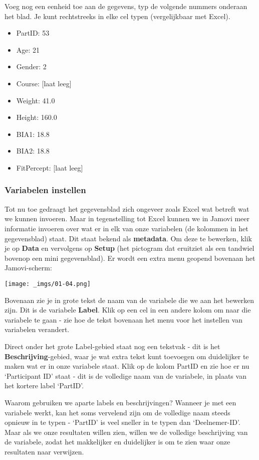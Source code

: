 \documentclass[
  letterpaper,
  DIV=11,
  numbers=noendperiod]{scrartcl}
\providecommand{\tightlist}{%
  \setlength{\itemsep}{0pt}\setlength{\parskip}{0pt}}\usepackage{longtable,booktabs,array}
\begin{document}
Voeg nog een eenheid toe aan de gegevens, typ de volgende nummers
onderaan het blad. Je kunt rechtstreeks in elke cel typen (vergelijkbaar
met Excel).

\begin{itemize}
\tightlist
\item
  PartID: 53
\item
  Age: 21
\item
  Gender: 2
\item
  Course: {[}laat leeg{]}
\item
  Weight: 41.0
\item
  Height: 160.0
\item
  BIA1: 18.8
\item
  BIA2: 18.8
\item
  FitPercept: {[}laat leeg{]}
\end{itemize}

\hypertarget{variabelen-instellen}{%
\subsubsection{Variabelen instellen}\label{variabelen-instellen}}

Tot nu toe gedraagt het gegevensblad zich ongeveer zoals Excel wat
betreft wat we kunnen invoeren. Maar in tegenstelling tot Excel kunnen
we in Jamovi meer informatie invoeren over wat er in elk van onze
variabelen (de kolommen in het gegevensblad) staat. Dit staat bekend als
\textbf{metadata}. Om deze te bewerken, klik je op \textbf{Data} en
vervolgens op \textbf{Setup} (het pictogram dat eruitziet als een
tandwiel bovenop een mini gegevensblad). Er wordt een extra menu geopend
bovenaan het Jamovi-scherm:

\texttt{[image: \_imgs/01-04.png]}

Bovenaan zie je in grote tekst de naam van de variabele die we aan het
bewerken zijn. Dit is de variabele \textbf{Label}. Klik op een cel in
een andere kolom om naar die variabele te gaan - zie hoe de tekst
bovenaan het menu voor het instellen van variabelen verandert.

Direct onder het grote Label-gebied staat nog een tekstvak - dit is het
\textbf{Beschrijving}-gebied, waar je wat extra tekst kunt toevoegen om
duidelijker te maken wat er in onze variabele staat. Klik op de kolom
PartID en zie hoe er nu `Participant ID' staat - dit is de volledige
naam van de variabele, in plaats van het kortere label `PartID'.

\begin{tcolorbox}[beforeafter skip=1cm, ignore nobreak=true, breakable, colframe=Aside-frame, colback=Aside-bg, coltext=Aside-text, boxsep=2mm, arc=0mm, boxrule=0.5mm]

Waarom gebruiken we aparte labels en beschrijvingen? Wanneer je met een
variabele werkt, kan het soms vervelend zijn om de volledige naam steeds
opnieuw in te typen - `PartID' is veel sneller in te typen dan
`Deelnemer-ID'. Maar als we onze resultaten willen zien, willen we de
volledige beschrijving van de variabele, zodat het makkelijker en
duidelijker is om te zien waar onze resultaten naar verwijzen.

\end{tcolorbox}
\end{document}
